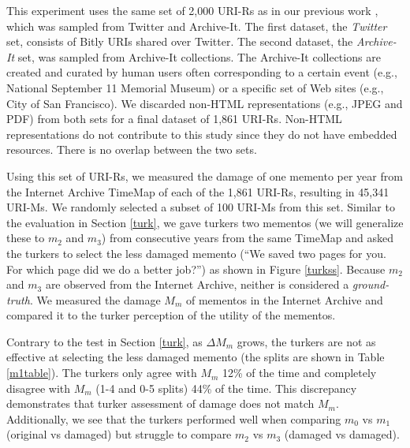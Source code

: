 This experiment uses the same set of 2,000 URI-Rs as in our previous work \cite{ijdl}, which was sampled from Twitter and Archive-It. The first dataset, the \emph{Twitter} set, consists of Bitly URIs shared over Twitter. The second dataset, the \emph{Archive-It} set, was sampled from Archive-It collections. The Archive-It collections are created and curated by human users often corresponding to a certain event (e.g., National September 11 Memorial Museum) or a specific set of Web sites (e.g., City of San Francisco). We discarded non-HTML representations (e.g., JPEG and PDF) from both sets for a final dataset of 1,861 URI-Rs. Non-HTML representations do not contribute to this study since they do not have embedded resources. There is no overlap between the two sets.

Using this set of URI-Rs, we measured the damage of one memento per year from the Internet Archive TimeMap of each of the 1,861 URI-Rs, resulting in 45,341 URI-Ms. We randomly selected a subset of 100 URI-Ms from this set. Similar to the evaluation in Section \ref{turk}, we gave turkers two mementos (we will generalize these to $m_2$ and $m_3$) from consecutive years from the same TimeMap and asked the turkers to select the less damaged memento (``We saved two pages for you. For which page did we do a better job?'') as shown in Figure \ref{turkss}. Because $m_2$ and $m_3$ are observed from the Internet Archive, neither is considered a \emph{ground-truth}. We measured the damage $M_m$ of mementos in the Internet Archive and compared it to the turker perception of the utility of the mementos. 

Contrary to the test in Section \ref{turk}, as {$\Delta M_m$} grows, the turkers are not as effective at selecting the less damaged memento (the splits are shown in Table \ref{m1table}). The turkers only agree with $M_m$ 12\% of the time and completely disagree with $M_m$ (1-4 and 0-5 splits) 44\% of the time. This discrepancy demonstrates that turker assessment of damage does not match $M_m$. Additionally, we see that the turkers performed well when comparing $m_0$ vs $m_1$ (original vs damaged) but struggle to compare $m_2$ vs $m_3$ (damaged vs damaged).


